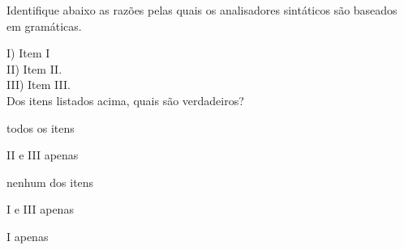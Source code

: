 \question[10]

Identifique abaixo as razões pelas quais os analisadores sintáticos são
baseados em gramáticas.

I) Item I\\
II) Item II.\\
III) Item III.\\

Dos itens listados acima, quais são verdadeiros?\\

\begin{choices}
\item todos os itens %
\item II e III apenas
\item nenhum dos itens
\item I e III apenas
\item I apenas
\end{choices}
\answerline


